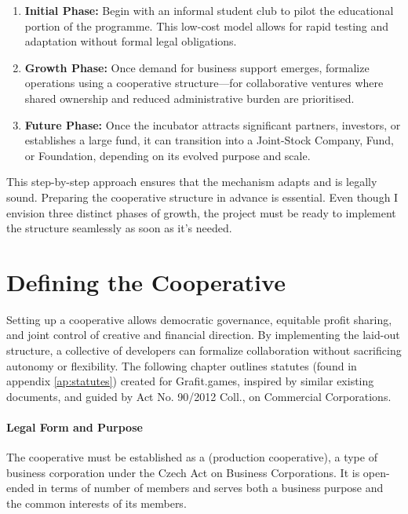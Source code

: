 \begin{enumerate}
    \item \textbf{Initial Phase:} Begin with an informal student club to pilot the educational portion of the programme. This low-cost model allows for rapid testing and adaptation without formal legal obligations.
    \item \textbf{Growth Phase:} Once demand for business support emerges, formalize operations using a cooperative structure—for collaborative ventures where shared ownership and reduced administrative burden are prioritised.
    \item \textbf{Future Phase:} Once the incubator attracts significant partners, investors, or establishes a large fund, it can transition into a Joint-Stock Company, Fund, or Foundation, depending on its evolved purpose and scale.
\end{enumerate}

This step-by-step approach ensures that the mechanism adapts and is legally sound. Preparing the cooperative structure in advance is essential. Even though I envision three distinct phases of growth, the project must be ready to implement the structure seamlessly as soon as it's needed.

\section{Defining the Cooperative}\label{sec:defining-coop}
Setting up a cooperative allows democratic governance, equitable profit sharing, and joint control of creative and financial direction. By implementing the laid-out structure, a collective of developers can formalize collaboration without sacrificing autonomy or flexibility. The following chapter outlines statutes (found in appendix \ref{ap:statutes}) created for Grafit.games, inspired by similar existing documents\cite{drevojas, stanovy-brno}, and guided by Act No. 90/2012 Coll., on Commercial Corporations\cite{ZOK}.

\paragraph{Legal Form and Purpose}
The cooperative must be established as a  (production cooperative), a type of business corporation under the Czech Act on Business Corporations. It is open-ended in terms of number of members and serves both a business purpose and the common interests of its members.

